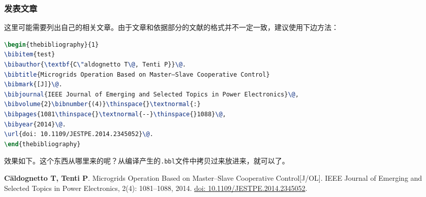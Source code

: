 \subsubsection{发表文章}
这里可能需要列出自己的相关文章。由于文章和依据部分的文献的格式并不一定一致，建议使用下边方法：
\begin{lstlisting}[language=tex, basicstyle=\ttfamily\small, keywordstyle=\color{blue}, commentstyle=\color{gray}]
\begin{thebibliography}{1}
\bibitem{test}
\bibauthor{\textbf{C\"aldognetto T\@, Tenti P}}\@. 
\bibtitle{Microgrids Operation Based on Master–Slave Cooperative Control}
\bibmark{[J]}\@.
\bibjournal{IEEE Journal of Emerging and Selected Topics in Power Electronics}\@,
\bibvolume{2}\bibnumber{(4)}\thinspace{}\textnormal{:}
\bibpages{1081\thinspace{}\textnormal{--}\thinspace{}1088}\@,
\bibyear{2014}\@.
\url{doi: 10.1109/JESTPE.2014.2345052}\@.
\end{thebibliography}
\end{lstlisting}
效果如下。这个东西从哪里来的呢？从编译产生的\verb|.bbl|文件中拷贝过来放进来，就可以了。
\vspace{-50pt}
\begin{thebibliography}{1}
\providecommand{\bibauthor}[1]{#1}
\providecommand{\bibeditor}[1]{#1}
\providecommand{\bibtranslator}[1]{#1}
\providecommand{\bibtitle}[1]{#1}
\providecommand{\bibbooktitle}[1]{#1}
\providecommand{\bibjournal}[1]{#1}
\providecommand{\bibmark}[1]{#1}
\providecommand{\bibcountry}[1]{#1}
\providecommand{\bibpatentid}[1]{#1}
\providecommand{\bibedition}[1]{#1}
\providecommand{\biborganization}[1]{#1}
\providecommand{\bibaddress}[1]{#1}
\providecommand{\bibpublisher}[1]{#1}
\providecommand{\bibinstitution}[1]{#1}
\providecommand{\bibschool}[1]{#1}
\providecommand{\bibvolume}[1]{#1}
\providecommand{\bibnumber}[1]{#1}
\providecommand{\bibversion}[1]{#1}
\providecommand{\bibpages}[1]{#1}
\providecommand{\bibmodifydate}[1]{#1}
\providecommand{\bibcitedate}[1]{#1}
\providecommand{\bibyear}[1]{#1}
\providecommand{\bibdate}[1]{#1}
\providecommand{\biburl}[1]{\newline\url{#1}}
	\bibauthor{\textbf{C\"aldognetto T\@, Tenti P}}\@. \bibtitle{Microgrids Operation Based
		on Master–Slave Cooperative Control}\bibmark{[J/OL]}\@. \bibjournal{IEEE
		Journal of Emerging and Selected Topics in Power Electronics}\@,
	\bibvolume{2}\bibnumber{(4)}\thinspace{}\textnormal{:
	}\bibpages{1081\thinspace{}\textnormal{--}\thinspace{}1088}\@,
	\bibyear{2014}\@. \url{doi: 10.1109/JESTPE.2014.2345052}\@.
\end{thebibliography}
\newpage